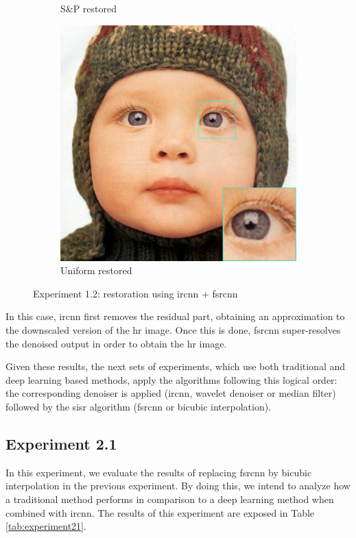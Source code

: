 \begin{figure}
\begin{subfigure}{0.24\textwidth}
		\caption{S\&P restored}
	\end{subfigure}
	\begin{subfigure}{0.24\textwidth}
		\includegraphics[width=\textwidth]{images/exp1.2/uniform.png}
		\caption{Uniform restored}
	\end{subfigure}
	\caption{Experiment 1.2: restoration using \gls{ircnn} $+$ \gls{fsrcnn}}
	\label{fig:exp1.2}
\end{figure}

In this case, \gls{ircnn} first removes the residual part, obtaining an approximation to the downscaled version of the \gls{hr} image. Once this is done, \gls{fsrcnn} super-resolves the denoised output in order to obtain the \gls{hr} image. 

Given these results, the next sets of experiments, which use both traditional and deep learning based methods, apply the algorithms following this logical order: the corresponding denoiser is applied (\gls{ircnn}, wavelet denoiser or median filter) followed by the \gls{sisr} algorithm (\gls{fsrcnn} or bicubic interpolation).


\subsection{Experiment 2.1}

In this experiment, we evaluate the results of replacing \gls{fsrcnn} by bicubic interpolation in the previous experiment. By doing this, we intend to analyze how a traditional method performs in comparison to a deep learning method when combined with \gls{ircnn}. The results of this experiment are exposed in Table \ref{tab:experiment21}.

